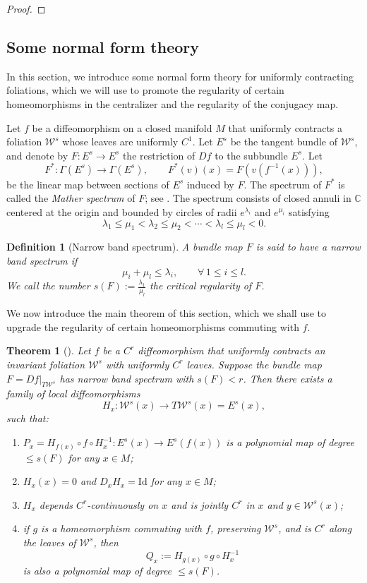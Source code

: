 \documentclass[11pt]{amsart}
\numberwithin{equation}{section}
\newcommand{\C}{\mathbb{C}}
\newcommand{\W}{\mathcal{W}}
\theoremstyle{plain}
\newtheorem{thm}{Theorem}[section]
\newtheorem{defi}{Definition}[section]
\begin{document}
\begin{proof}
\end{proof}



\subsection{Some normal form theory}\label{sec:normalform}
In this section, we introduce some normal form theory for uniformly contracting foliations, which we will use to promote the regularity of certain homeomorphisms in the centralizer and the regularity of the conjugacy map.

Let $f$ be a diffeomorphism on a closed manifold $M$ that uniformly contracts a foliation $\W^s$ whose leaves are uniformly $C^1$. Let $E^s$ be the tangent bundle of $\W^s$, and denote by $F:E^s\to E^s$ the restriction of $Df$ to the subbundle $E^s$. Let
\[
F^*:\Gamma(E^s)\to \Gamma(E^s), \qquad F^*(v)(x)=F(v(f^{-1}(x))),
\]
be the linear map between sections of $E^s$ induced by $F$. The spectrum of $F^*$ is called the \emph{Mather spectrum} of $F$; see \cite{Mather}. The spectrum consists of closed annuli in $\C$ centered at the origin and bounded by circles of radii $e^{\lambda_i}$ and $e^{\mu_i}$ satisfying
\[
\lambda_1 \le \mu_1 < \lambda_2 \le \mu_2 < \cdots < \lambda_l \le \mu_l < 0.
\]

\begin{defi}[Narrow band spectrum]
A bundle map $F$ is said to have a \emph{narrow band spectrum} if
\[
\mu_i+\mu_l \le \lambda_i,\qquad \forall\, 1\le i \le l.
\]
We call the number $s(F):=\frac{\lambda_1}{\mu_l}$ the \emph{critical regularity} of $F$.
\end{defi}

We now introduce the main theorem of this section, which we shall use to upgrade the regularity of certain homeomorphisms commuting with $f$.

\begin{thm}[\cite{normalform}]\label{normalform}
Let $f$ be a $C^r$ diffeomorphism that uniformly contracts an invariant foliation $\W^s$ with uniformly $C^r$ leaves. Suppose the bundle map $F=Df|_{T\W^s}$ has narrow band spectrum with $s(F)<r$. Then there exists a family of local diffeomorphisms
\[
H_x:\W^s(x)\to T\W^s(x)=E^s(x),
\]
such that:

\begin{enumerate}
\item $P_x=H_{f(x)}\circ f\circ H_x^{-1}:E^s(x)\to E^s(f(x))$ is a polynomial map of degree $\le s(F)$ for any $x\in M$;

\item $H_x(x)=0$ and $D_xH_x=\mathrm{Id}$ for any $x\in M$;

\item $H_x$ depends $C^r$-continuously on $x$ and is jointly $C^r$ in $x$ and $y\in \W^s(x)$;

\item if $g$ is a homeomorphism commuting with $f$, preserving $\W^s$, and is $C^r$ along the leaves of $\W^s$, then
\[
Q_x:=H_{g(x)}\circ g\circ H_x^{-1}
\]
is also a polynomial map of degree $\le s(F)$.
\end{enumerate}
\end{thm}
\end{document}
